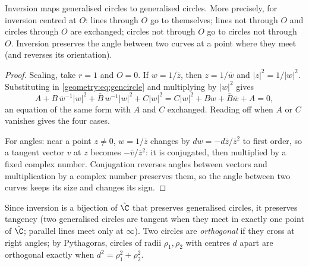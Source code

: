\begin{theorem}\label{geometry:thm:invcircles}
Inversion maps generalised circles to generalised circles. More precisely, for inversion centred at $O$: lines through $O$ go to themselves;
lines not through $O$ and circles through $O$ are exchanged; circles not through $O$ go to circles not through $O$. Inversion preserves the
angle between two curves at a point where they meet (and reverses its orientation).
\end{theorem}
\begin{proof}
Scaling, take $r=1$ and $O=0$. If $w=1/\bar z$, then $z=1/\bar w$ and $|z|^2=1/|w|^2$. Substituting in \eqref{geometry:eq:gencircle} and multiplying by
$|w|^2$ gives
\[
A+B\,\bar w^{-1}|w|^2+\bar B\,w^{-1}|w|^2+C|w|^2=C|w|^2+Bw+\bar B\bar w+A=0,
\]
an equation of the same form with $A$ and $C$ exchanged. Reading off when $A$ or $C$ vanishes gives the four cases.

For angles: near a point $z\ne0$, $w=1/\bar z$ changes by $dw=-d\bar z/\bar z^2$ to first order, so a tangent vector $v$ at $z$ becomes
$-\bar v/\bar z^2$: it is conjugated, then multiplied by a fixed complex number. Conjugation reverses angles between vectors and
multiplication by a complex number preserves them, so the angle between two curves keeps its size and changes its sign.
\end{proof}

Since inversion is a bijection of $\hat{\C}$ that preserves generalised circles, it preserves tangency (two generalised circles are tangent
when they meet in exactly one point of $\hat{\C}$; parallel lines meet only at $\infty$). Two circles are \emph{orthogonal} if they cross at
right angles; by Pythagoras, circles of radii $\rho_1,\rho_2$ with centres $d$ apart are orthogonal exactly when $d^2=\rho_1^2+\rho_2^2$.

